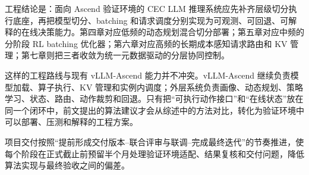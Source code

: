 工程结论是：面向 Ascend 验证环境的 CEC LLM 推理系统应先补齐层级切分执行底座，再把模型切分、batching 和请求调度分别实现为可观测、可回退、可解释的在线决策能力。第四章对应低频的动态规划混合切分部署；第五章对应中频的分阶段 RL batching 优化器；第六章对应高频的长期成本感知请求路由和 KV 管理；第七章则把三者收敛为统一元数据驱动的分层协同控制。

这样的工程路线与现有 vLLM-Ascend 能力并不冲突。vLLM-Ascend 继续负责模型加载、算子执行、KV 管理和实例内调度；外层系统负责画像、动态规划、策略学习、状态、路由、动作裁剪和回退。只有把“可执行动作接口”和“在线状态”放在同一个闭环中，前文提出的算法建议才会从综述中的方法对比，转化为验证环境中可以部署、压测和解释的工程方案。

项目交付按照“提前形成交付版本--联合评审与联调--完成最终迭代”的节奏推进，使每个阶段在正式截止前预留半个月处理验证环境适配、结果复核和交付问题，降低算法实现与最终验收之间的偏差。
